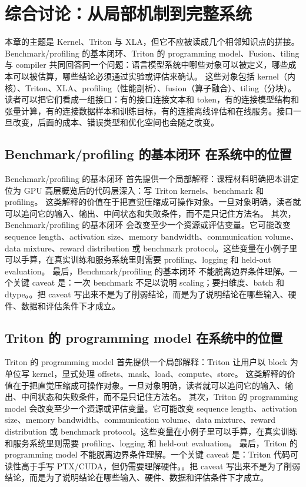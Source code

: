 \documentclass[a4paper]{article}
\begin{document}
\section{综合讨论：从局部机制到完整系统}
本章的主题是 Kernel、Triton 与 XLA，但它不应被读成几个相邻知识点的拼接。Benchmark/profiling 的基本闭环、Triton 的 programming model、Fusion、tiling 与 compiler 共同回答同一个问题：语言模型系统中哪些对象可以被定义，哪些成本可以被估算，哪些结论必须通过实验或评估来确认。
这些对象包括 kernel（内核）、Triton、XLA、profiling（性能剖析）、fusion（算子融合）、tiling（分块）。读者可以把它们看成一组接口：有的接口连接文本和 token，有的连接模型结构和张量计算，有的连接数据样本和训练目标，有的连接离线评估和在线服务。接口一旦改变，后面的成本、错误类型和优化空间也会随之改变。
\subsection{Benchmark/profiling 的基本闭环 在系统中的位置}
Benchmark/profiling 的基本闭环 首先提供一个局部解释：课程材料明确把本讲定位为 GPU 高层概览后的代码层深入：写 Triton kernels、benchmark 和 profiling。 这类解释的价值在于把直觉压缩成可操作对象。一旦对象明确，读者就可以追问它的输入、输出、中间状态和失败条件，而不是只记住方法名。
其次，Benchmark/profiling 的基本闭环 会改变至少一个资源或评估变量。它可能改变 sequence length、activation size、memory bandwidth、communication volume、data mixture、reward distribution 或 benchmark protocol。这些变量在小例子里可以手算，在真实训练和服务系统里则需要 profiling、logging 和 held-out evaluation。
最后，Benchmark/profiling 的基本闭环 不能脱离边界条件理解。一个关键 caveat 是：一次 benchmark 不足以说明 scaling；要扫维度、batch 和 dtype。。把 caveat 写出来不是为了削弱结论，而是为了说明结论在哪些输入、硬件、数据和评估条件下才成立。
\subsection{Triton 的 programming model 在系统中的位置}
Triton 的 programming model 首先提供一个局部解释：Triton 让用户以 block 为单位写 kernel，显式处理 offsets、mask、load、compute、store。 这类解释的价值在于把直觉压缩成可操作对象。一旦对象明确，读者就可以追问它的输入、输出、中间状态和失败条件，而不是只记住方法名。
其次，Triton 的 programming model 会改变至少一个资源或评估变量。它可能改变 sequence length、activation size、memory bandwidth、communication volume、data mixture、reward distribution 或 benchmark protocol。这些变量在小例子里可以手算，在真实训练和服务系统里则需要 profiling、logging 和 held-out evaluation。
最后，Triton 的 programming model 不能脱离边界条件理解。一个关键 caveat 是：Triton 代码可读性高于手写 PTX/CUDA，但仍需要理解硬件。。把 caveat 写出来不是为了削弱结论，而是为了说明结论在哪些输入、硬件、数据和评估条件下才成立。
\end{document}
